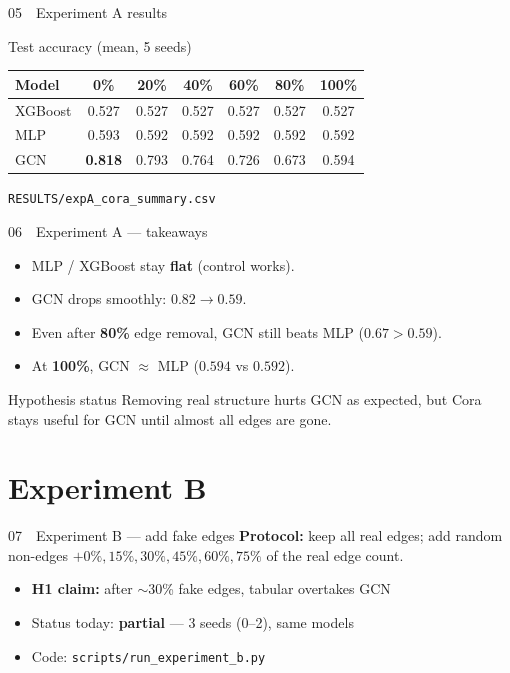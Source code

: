 \documentclass[
  english,
  aspectratio=169,
]{beamer}
\begin{document}
\begin{frame}{05~~Experiment A results}
  \begin{block}{Test accuracy (mean, 5 seeds)}
    \scriptsize
    \renewcommand{\arraystretch}{1.15}
    \begin{tabular}{lcccccc}
      \textbf{Model} & 0\% & 20\% & 40\% & 60\% & 80\% & 100\% \\
      \hline
      XGBoost & 0.527 & 0.527 & 0.527 & 0.527 & 0.527 & 0.527 \\
      MLP & 0.593 & 0.592 & 0.592 & 0.592 & 0.592 & 0.592 \\
      GCN & \textbf{0.818} & 0.793 & 0.764 & 0.726 & 0.673 & 0.594 \\
    \end{tabular}
  \end{block}

  \vspace{0.4em}
  {\small \texttt{RESULTS/expA\_cora\_summary.csv}}
\end{frame}

\begin{frame}{06~~Experiment A --- takeaways}
  \begin{itemize}
    \item MLP / XGBoost stay \textbf{flat} (control works).
    \item GCN drops smoothly: $0.82 \rightarrow 0.59$.
    \item Even after \textbf{80\%} edge removal, GCN still beats MLP
      ($0.67 > 0.59$).
    \item At \textbf{100\%}, GCN $\approx$ MLP ($0.594$ vs $0.592$).
  \end{itemize}

  \vspace{0.4em}
  \begin{block}{Hypothesis status}
    Removing real structure hurts GCN as expected, but Cora stays
    useful for GCN until almost all edges are gone.
  \end{block}
\end{frame}

\section{Experiment B}

\begin{frame}{07~~Experiment B --- add fake edges}
  \textbf{Protocol:} keep all real edges; add random non-edges
  $+0\%, 15\%, 30\%, 45\%, 60\%, 75\%$ of the real edge count.

  \begin{itemize}
    \item \textbf{H1 claim:} after $\sim$30\% fake edges, tabular overtakes GCN
    \item Status today: \textbf{partial} --- 3 seeds (0--2), same models
    \item Code: \texttt{scripts/run\_experiment\_b.py}
  \end{itemize}
\end{frame}
\end{document}
